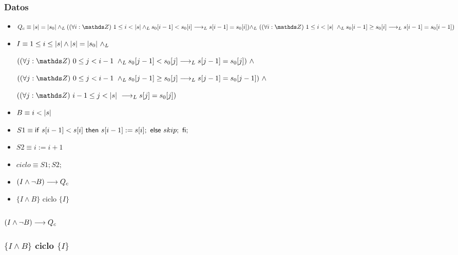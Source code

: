 \documentclass{article}
\begin{document}
\subsubsection*{Datos}
\begin{itemize}
    \item $Q_{c}    \equiv \longitud{s} = \longitud{s_0} \yLuego (\paraTodo{i}{1}{\longitud{s} \yLuego s_0[i-1] < s_0[i] \implicaLuego s[i-1]=s_0[i])  \yLuego $
    
    $(\paraTodo{i}{1}{\longitud{s}} \yLuego s_0[i-1] \geq s_0[i] \implicaLuego s[i-1] = s_0[i-1])}$

    \item $I        \equiv 1 \leq i \leq |s| \wedge |s| = |s_0|\ \land _L$

    $(\paraTodo{j}{0}{i-1} \yLuego s_0[j-1] < s_0[j] \implicaLuego s[j-1] = s_0[j])\ \wedge $

    $(\paraTodo{j}{0}{i-1} \yLuego s_0[j-1] \geq s_0[j] \implicaLuego s[j-1] = s_0[j-1])\ \wedge $

    $(\paraTodo{j}{i-1}{\longitud{s}} \implicaLuego s[j] = s_0[j])$

    \item $B        \equiv i < |s|$
    \item $S1       \equiv \mathsf{if}\ s[i-1] < s[i]\ \mathsf{then}\ s[i-1]:= s[i];\ \mathsf{else}\ skip;\ \mathsf{fi};$
    \item $S2       \equiv i := i + 1$
    \item $ciclo    \equiv S1;S2;$
\end{itemize}

\begin{itemize}
    \item $(I \wedge \neg B) \longrightarrow Q_{c}$
    \item $\{I \wedge B\}$ ciclo $\{ I \}$
\end{itemize}

\subsubsection*{$(I \wedge \neg B) \longrightarrow Q_{c}$}


\subsubsection*{$\{I \wedge B\}$ ciclo $\{ I \}$}
\end{document}
